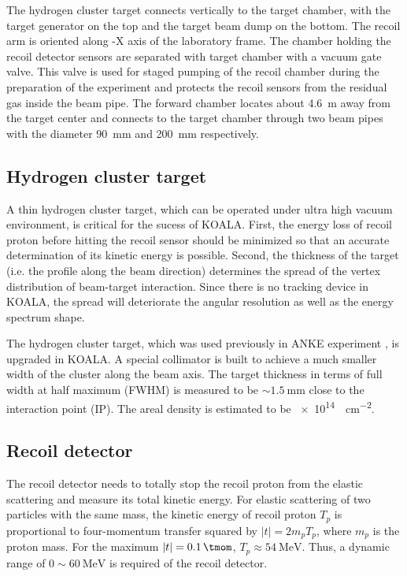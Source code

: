\documentclass[number,5p]{elsarticle}
\begin{document}
The hydrogen cluster target connects vertically to the target chamber, with the target generator on the top and the target beam dump on the bottom.
The recoil arm is oriented along -X axis of the laboratory frame.
The chamber holding the recoil detector sensors are separated with target
chamber with a vacuum gate valve.
This valve is used for staged pumping of the recoil chamber during the
preparation of the experiment and protects the recoil sensors from the residual
gas inside the beam pipe.
The forward chamber locates about \SI{4.6}{\meter} away from the target center and
connects to the target chamber through two beam pipes with the diameter \SI{90}{\mm} and \SI{200}{\mm} respectively. 

\subsection{Hydrogen cluster target}
\label{sec:target}

A thin hydrogen cluster target, which can be operated under ultra high vacuum
environment, is critical for the sucess of KOALA.
First, the energy loss of recoil proton before hitting the recoil sensor should
be minimized so that an accurate determination of its kinetic energy is possible.
Second, the thickness of the target (i.e. the profile along the beam direction) determines
the spread of the vertex distribution of beam-target interaction.
Since there is no tracking device in KOALA, the spread will deteriorate the
angular resolution as well as the energy spectrum shape.

The hydrogen cluster target, which was used previously in ANKE experiment
\cite{cluster_target}, is upgraded in KOALA.
A special collimator is built to achieve a much
smaller width of the cluster along the beam axis.
The target thickness in terms of full width at half maximum (FWHM) is measured
to be $\sim\SI{1.5}{\mm}$ close to the interaction point (IP).
The areal density is estimated to be \SI{e14}{\atom\per\cm\squared}.

\subsection{Recoil detector}
\label{sec:recoil}

The recoil detector needs to totally stop the recoil proton from the
elastic scattering and measure its total kinetic energy.
For elastic scattering of two particles with the same mass,
the kinetic energy of recoil proton \(T_p\) is proportional to four-momentum
transfer squared by \(|t| = 2m_pT_p\), where \(m_p\) is the proton mass.
For the maximum $|t|=\SI{0.1}{\tmom}$, \(T_p \approx \SI{54}{\MeV}\). Thus, a dynamic range of
$0\sim\SI{60}{\MeV}$ is required of the recoil detector.
\end{document}
